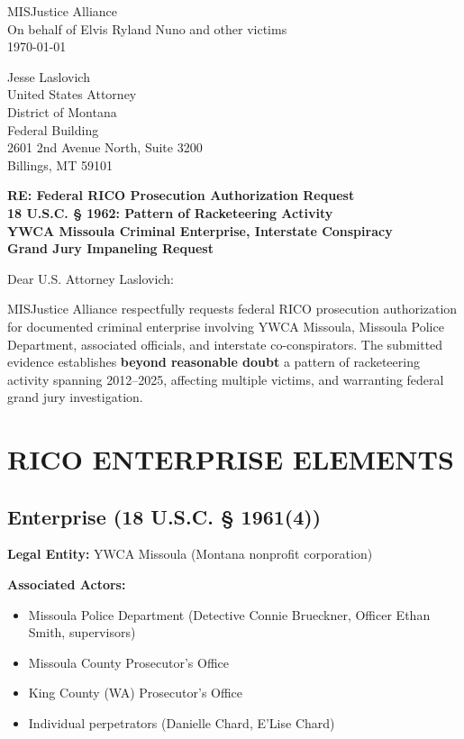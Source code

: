 \documentclass[12pt,oneside]{article}
\begin{document}
\begin{flushleft}
MISJustice Alliance \\
On behalf of Elvis Ryland Nuno and other victims \\
\today
\vspace{0.3in}

Jesse Laslovich \\
United States Attorney \\
District of Montana \\
Federal Building \\
2601 2nd Avenue North, Suite 3200 \\
Billings, MT 59101
\vspace{0.3in}

\textbf{RE: Federal RICO Prosecution Authorization Request} \\
\textbf{18 U.S.C. § 1962: Pattern of Racketeering Activity} \\
\textbf{YWCA Missoula Criminal Enterprise, Interstate Conspiracy} \\
\textbf{Grand Jury Impaneling Request}
\vspace{0.3in}

Dear U.S. Attorney Laslovich:
\vspace{0.2in}

MISJustice Alliance respectfully requests federal RICO prosecution authorization for documented criminal enterprise involving YWCA Missoula, Missoula Police Department, associated officials, and interstate co-conspirators. The submitted evidence establishes \textbf{beyond reasonable doubt} a pattern of racketeering activity spanning 2012--2025, affecting multiple victims, and warranting federal grand jury investigation.

\section*{RICO ENTERPRISE ELEMENTS}

\subsection*{Enterprise (18 U.S.C. § 1961(4))}

\textbf{Legal Entity:} YWCA Missoula (Montana nonprofit corporation)

\textbf{Associated Actors:}
\begin{itemize}
\item Missoula Police Department (Detective Connie Brueckner, Officer Ethan Smith, supervisors)
\item Missoula County Prosecutor's Office
\item King County (WA) Prosecutor's Office
\item Individual perpetrators (Danielle Chard, E'Lise Chard)
\end{itemize}


\end{flushleft}
\end{document}
